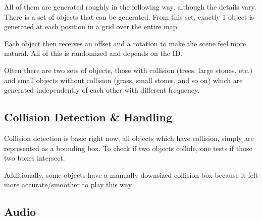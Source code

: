\documentclass[11pt]{article}
\begin{document}
\par All of them are generated roughly in the following way, although the details vary. There is a set of objects that can be generated. From this set, exactly 1 object is generated at each position in a grid over the entire map. 
\par Each object then receives an offset and a rotation to make the scene feel more natural. All of this is randomized and depends on the ID. 
\par Often there are two sets of objects, those with collision (trees, large stones, etc.) and small objects without collision (grass, small stones, and so on) which are generated independently of each other with different frequency.


\subsection{Collision Detection \& Handling}
\par Collision detection is basic right now, all objects which have collision, simply are represented as a bounding box. To check if two objects collide, one tests if those two boxes intersect.
\par Additionally, some objects have a manually downsized collision box because it felt more accurate/smoother to play this way. 
\subsection{Audio}





\end{document}
